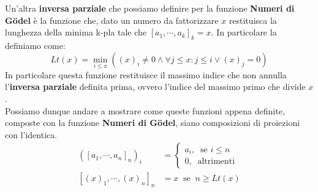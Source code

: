 Un'altra \textbf{inversa parziale} che possiamo definire per la funzione \textbf{Numeri di Gödel} è la funzione che, dato un numero da fattorizzare \(x\) restituisca la lunghezza della minima k-pla tale che \({[a_1,\cdots,a_k]}_k=x\). In particolare la definiamo come:
\begin{equation}
  Lt(x)=\min_{i\leq x}({(x)}_i\neq 0 \land \forall j\leq x: j\leq i \lor {(x)}_j=0)
\end{equation}
In particolare questa funzione restituisce il massimo indice che non annulla l'\textbf{inversa parziale} definita prima, ovvero l'indice del massimo primo che divide \(x\).\\
Possiamo dunque andare a mostrare come queste funzioni appena definite, composte con la funzione \textbf{Numeri di Gödel}, siano composizioni di proiezioni con l'identica.
\begin{equation}
  \begin{split}
    {({[a_1,\cdots,a_n]}_n)}_i&=\begin{cases}
                        a_i, \;\; \text{se } i\leq n\\
                        0, \;\; \text{altrimenti}
                      \end{cases}\\
    {[{(x)}_1,\cdots,{(x)}_n]}_n&=x\;\; \text{se} \;\; n\geq Lt(x)
  \end{split}
\end{equation}

